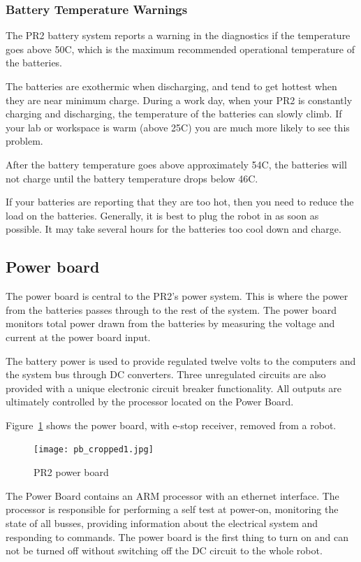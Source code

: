 \subsubsection{Battery Temperature Warnings}

The PR2 battery system reports a warning in the diagnostics if the temperature goes above 50C, which is the maximum recommended operational temperature of the batteries. 

The batteries are exothermic when discharging, and tend to get hottest when they are near minimum charge. During a work day, when your PR2 is constantly charging and discharging, the temperature of the batteries can slowly climb. If your lab or workspace is warm (above 25C) you are much more likely to see this problem.

After the battery temperature goes above approximately 54C, the batteries will not charge until the battery temperature drops below 46C. 

If your batteries are reporting that they are too hot, then you need to reduce the load on the batteries. Generally, it is best to plug the robot in as soon as possible. It may take several hours for the batteries too cool down and charge.

\subsection{Power board}
The power board is central to the PR2's power system. This is where
the power from the batteries passes through to the rest of the
system. The power board monitors total power drawn from the batteries
by measuring the voltage and current at the power board input.

The battery power is used to provide regulated twelve volts to the computers and
the system bus through DC converters. Three unregulated circuits are also
provided with a unique electronic circuit breaker functionality. All outputs are
ultimately controlled by the processor located on the Power Board.

Figure~\ref{fig:power_board} shows the power board, with e-stop receiver, removed from a robot.

\begin{figure}[tb]
\centering
\texttt{[image: pb\_cropped1.jpg]}
\caption{PR2 power board}
\label{fig:power_board}
\end{figure}


The Power Board contains an ARM processor with an ethernet interface. The
processor is responsible for performing a self test at power-on, monitoring the
state of all busses, providing information about the electrical system and
responding to commands. The power board is the first thing to turn on and can
not be turned off without switching off the DC circuit to the whole robot.

